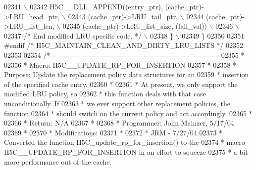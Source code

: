 \begin{DoxyCode}
02341 \textcolor{preprocessor}{                                                                           \(\backslash\)}
02342 \textcolor{preprocessor}{        H5C\_\_DLL\_APPEND((entry\_ptr), (cache\_ptr)->LRU\_head\_ptr,            \(\backslash\)}
02343 \textcolor{preprocessor}{                        (cache\_ptr)->LRU\_tail\_ptr,                         \(\backslash\)}
02344 \textcolor{preprocessor}{            (cache\_ptr)->LRU\_list\_len,                         \(\backslash\)}
02345 \textcolor{preprocessor}{                        (cache\_ptr)->LRU\_list\_size, (fail\_val))            \(\backslash\)}
02346 \textcolor{preprocessor}{                                                                           \(\backslash\)}
02347 \textcolor{preprocessor}{        }\textcolor{comment}{/* End modified LRU specific code. */}\textcolor{preprocessor}{                              \(\backslash\)}
02348 \textcolor{preprocessor}{    \}                                                                      \(\backslash\)}
02349 \textcolor{preprocessor}{\}}
02350 
02351 \textcolor{preprocessor}{#endif }\textcolor{comment}{/* H5C\_MAINTAIN\_CLEAN\_AND\_DIRTY\_LRU\_LISTS */}\textcolor{preprocessor}{}
02352 
02353 
02354 \textcolor{comment}{/*-------------------------------------------------------------------------}
02355 \textcolor{comment}{ *}
02356 \textcolor{comment}{ * Macro:   H5C\_\_UPDATE\_RP\_FOR\_INSERTION}
02357 \textcolor{comment}{ *}
02358 \textcolor{comment}{ * Purpose:     Update the replacement policy data structures for an}
02359 \textcolor{comment}{ *      insertion of the specified cache entry.}
02360 \textcolor{comment}{ *}
02361 \textcolor{comment}{ *      At present, we only support the modified LRU policy, so}
02362 \textcolor{comment}{ *      this function deals with that case unconditionally.  If}
02363 \textcolor{comment}{ *      we ever support other replacement policies, the function}
02364 \textcolor{comment}{ *      should switch on the current policy and act accordingly.}
02365 \textcolor{comment}{ *}
02366 \textcolor{comment}{ * Return:      N/A}
02367 \textcolor{comment}{ *}
02368 \textcolor{comment}{ * Programmer:  John Mainzer, 5/17/04}
02369 \textcolor{comment}{ *}
02370 \textcolor{comment}{ * Modifications:}
02371 \textcolor{comment}{ *}
02372 \textcolor{comment}{ *      JRM - 7/27/04}
02373 \textcolor{comment}{ *      Converted the function H5C\_update\_rp\_for\_insertion() to the}
02374 \textcolor{comment}{ *      macro H5C\_\_UPDATE\_RP\_FOR\_INSERTION in an effort to squeeze}
02375 \textcolor{comment}{ *      a bit more performance out of the cache.}

\end{DoxyCode}
